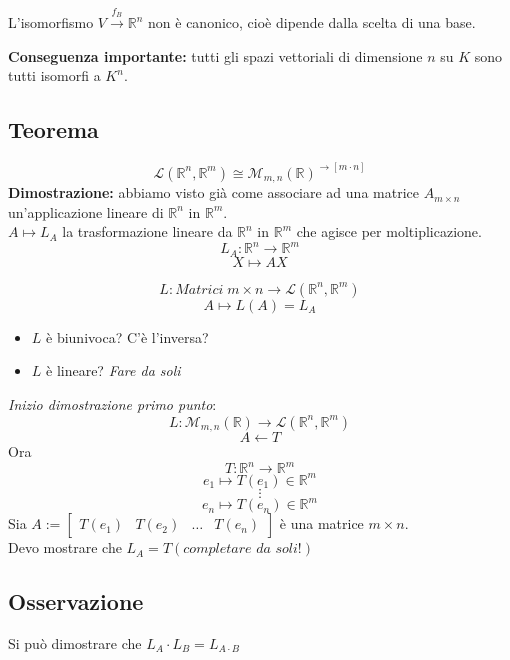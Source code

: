 L'isomorfismo $V\xrightarrow{f_B}\mathbb{R}^n$ non è canonico, cioè dipende dalla scelta di una base.

\textbf{Conseguenza importante:} tutti gli spazi vettoriali di dimensione $n$ su $K$ sono tutti isomorfi a $K^n$.

\subsection{Teorema}
\[\mathcal{L}(\mathbb{R}^n,\mathbb{R}^m)\cong\mathcal{M}_{m,n}(\mathbb{R})^{\rightarrow[m\cdot n]}\]
\textbf{Dimostrazione:} abbiamo visto già come associare ad una matrice $A_{m\times n}$ un'applicazione lineare di $\mathbb{R}^n$ in $\mathbb{R}^m$.
\\$A\mapsto L_A$ la trasformazione lineare da $\mathbb{R}^n$ in $\mathbb{R}^m$ che agisce per moltiplicazione.
\[L_A:\mathbb{R}^n\rightarrow\mathbb{R}^m\]
\[X\mapsto AX\]

\[L:Matrici\;m\times n\rightarrow \mathcal{L}(\mathbb{R}^n,\mathbb{R}^m)\]
\[A\mapsto L(A)=L_A\]
\begin{itemize}
	\item $L$ è biunivoca? C'è l'inversa?
	\item $L$ è lineare? \textit{Fare da soli}
\end{itemize}
\textit{Inizio dimostrazione primo punto}:
\[L:\mathcal{M}_{m,n}(\mathbb{R})\rightarrow\mathcal{L}(\mathbb{R}^n,\mathbb{R}^m)\]
\[A\leftarrow T\]
Ora
\[T:\mathbb{R}^n\rightarrow\mathbb{R}^m\]
\[e_1\mapsto T(e_1)\in\mathbb{R}^m\]
\[\vdots\]
\[e_n\mapsto T(e_n)\in\mathbb{R}^m\]
Sia $A:=\begin{bmatrix}T(e_1) & T(e_2) & \dots & T(e_n)\end{bmatrix}$ è una matrice $m\times n$.
\\Devo mostrare che $L_A=T (\textit{completare da soli!})$

\subsection{Osservazione}
Si può dimostrare che $L_A\cdot L_B=L_{A\cdot B}$

